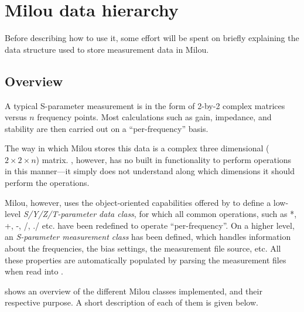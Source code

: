 %

\section{Milou data hierarchy} %
Before describing how to use it, some effort will be spent on
briefly explaining the data structure used to store measurement
data in Milou.

\subsection{Overview}
A typical S-parameter measurement is in the form of 2-by-2 complex
matrices versus $n$ frequency points. Most calculations such as
gain, impedance, and stability are then carried out on a
``per-frequency'' basis.

The way in which Milou stores this data is a complex three
dimensional ($2 \times 2\times n$) matrix. \matlab, however, has
no built in functionality to perform operations in this
manner---it simply does not understand along which dimensions it
should perform the operations.

Milou, however, uses the object-oriented capabilities offered by
\matlab to define a low-level \emph{S/Y/Z/T-parameter data class},
for which all common \matlab operations, such as *, +, -, /, ./
etc. have been redefined to operate ``per-frequency''. On a higher
level, an \emph{S-parameter measurement class} has been defined,
which handles information about the frequencies, the bias
settings, the measurement file source, etc. All these properties
are automatically populated by parsing the measurement files when
read into \matlab.

 shows an overview of the different Milou
classes implemented, and their respective purpose. A short
description of each of them is given below.

